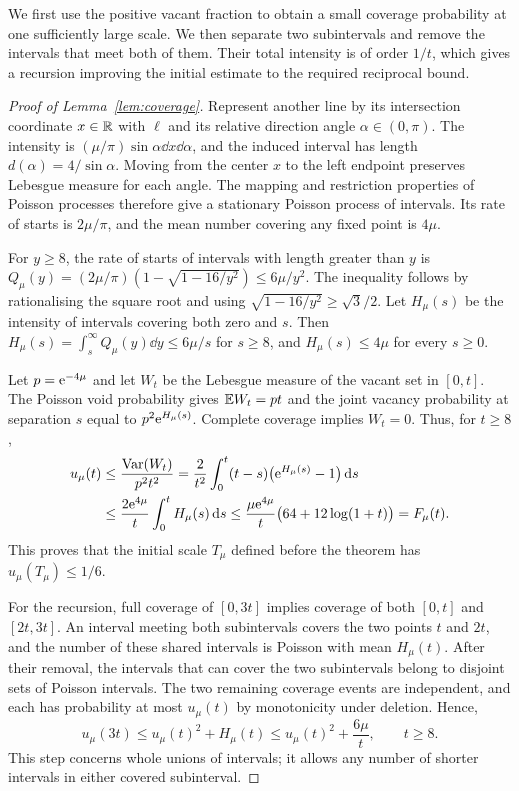\documentclass[11pt,letterpaper]{article}
\begin{document}
We first use the positive vacant fraction to obtain a small coverage probability at one sufficiently large scale. We then separate two subintervals and remove the intervals that meet both of them. Their total intensity is of order $1/t$, which gives a recursion improving the initial estimate to the required reciprocal bound.

\begin{proof}[Proof of Lemma~\ref{lem:coverage}]
Represent another line by its intersection coordinate $x\in\mathbb R$ with $\ell$ and its relative direction angle $\alpha\in(0,\pi)$. The intensity is $(\mu/\pi)\sin\alpha\dd x\dd\alpha$, and the induced interval has length $d(\alpha)=4/\sin\alpha$. Moving from the center $x$ to the left endpoint preserves Lebesgue measure for each angle. The mapping and restriction properties of Poisson processes \cite[Section~5.1]{LP17} therefore give a stationary Poisson process of intervals. Its rate of starts is $2\mu/\pi$, and the mean number covering any fixed point is $4\mu$.

For $y\ge8$, the rate of starts of intervals with length greater than $y$ is
$Q_\mu(y)=(2\mu/\pi)(1-\sqrt{1-16/y^2})\le6\mu/y^2$. The inequality follows by rationalising the square root and using $\sqrt{1-16/y^2}\ge\sqrt3/2$. Let $H_\mu(s)$ be the intensity of intervals covering both zero and $s$. Then $H_\mu(s)=\int_s^\infty Q_\mu(y)\dd y\le6\mu/s$ for $s\ge8$, and $H_\mu(s)\le4\mu$ for every $s\ge0$.

Let $p=\mathrm{e}^{-4\mu}$ and let $W_t$ be the Lebesgue measure of the vacant set in $[0,t]$. The Poisson void probability gives $\mathbb E W_t=pt$ and the joint vacancy probability at separation $s$ equal to $p^2\mathrm{e}^{H_\mu(s)}$. Complete coverage implies $W_t=0$. Thus, for $t\ge8$,
\begin{equation}\label{eq:initial}
\begin{aligned}
 u_\mu(t)&\le\frac{\operatorname{Var}(W_t)}{p^2t^2}
     =\frac{2}{t^2}\int_0^t(t-s)
                   \big(\mathrm{e}^{H_\mu(s)}-1\big)\,\mathrm{d} s\\
 &\le\frac{2\mathrm{e}^{4\mu}}{t}\int_0^tH_\mu(s)\,\mathrm{d} s
  \le\frac{\mu\mathrm{e}^{4\mu}}{t}
               \big(64+12\log(1+t)\big)=F_\mu(t).
\end{aligned}
\end{equation}
This proves that the initial scale $T_\mu$ defined before the theorem has $u_\mu(T_\mu)\le1/6$.

For the recursion, full coverage of $[0,3t]$ implies coverage of both $[0,t]$ and $[2t,3t]$. An interval meeting both subintervals covers the two points $t$ and $2t$, and the number of these shared intervals is Poisson with mean $H_\mu(t)$. After their removal, the intervals that can cover the two subintervals belong to disjoint sets of Poisson intervals. The two remaining coverage events are independent, and each has probability at most $u_\mu(t)$ by monotonicity under deletion. Hence,
\begin{equation}\label{eq:recursion}
 u_\mu(3t)\le u_\mu(t)^2+H_\mu(t)
           \le u_\mu(t)^2+\frac{6\mu}{t},\qquad t\ge8.
\end{equation}
This step concerns whole unions of intervals; it allows any number of shorter intervals in either covered subinterval.


\end{proof}
\end{document}
